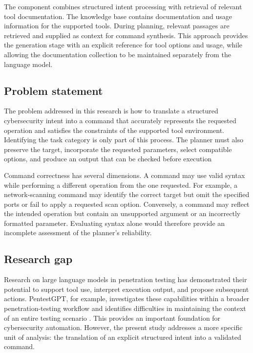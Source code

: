 \documentclass[
]{article}
\begin{document}
The component combines structured intent processing with retrieval of
relevant tool documentation. The knowledge base contains documentation
and usage information for the supported tools. During planning, relevant
passages are retrieved and supplied as context for command synthesis.
This approach provides the generation stage with an explicit reference
for tool options and usage, while allowing the documentation collection
to be maintained separately from the language model.

\hypertarget{problem-statement}{%
\subsection{Problem statement}\label{problem-statement}}

The problem addressed in this research is how to translate a structured
cybersecurity intent into a command that accurately represents the
requested operation and satisfies the constraints of the supported tool
environment. Identifying the task category is only part of this process.
The planner must also preserve the target, incorporate the requested
parameters, select compatible options, and produce an output that can be
checked before execution

Command correctness has several dimensions. A command may use valid
syntax while performing a different operation from the one requested.
For example, a network-scanning command may identify the correct target
but omit the specified ports or fail to apply a requested scan option.
Conversely, a command may reflect the intended operation but contain an
unsupported argument or an incorrectly formatted parameter. Evaluating
syntax alone would therefore provide an incomplete assessment of the
planner's reliability.

\hypertarget{research-gap}{%
\subsection{Research gap}\label{research-gap}}

Research on large language models in penetration testing has
demonstrated their potential to support tool use, interpret execution
output, and propose subsequent actions. PentestGPT, for example,
investigates these capabilities within a broader penetration-testing
workflow and identifies difficulties in maintaining the context of an
entire testing scenario . This provides an important foundation for
cybersecurity automation. However, the present study addresses a more
specific unit of analysis: the translation of an explicit structured
intent into a validated command.
\end{document}
